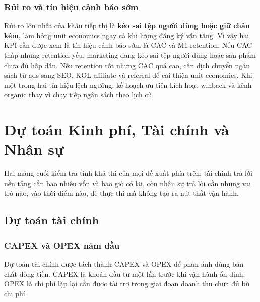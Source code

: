 \subsubsection{Rủi ro và tín hiệu cảnh báo sớm}

Rủi ro lớn nhất của khâu tiếp thị là \textbf{kéo sai tệp người dùng hoặc giữ chân kém}, làm hỏng unit economics ngay cả khi lượng đăng ký vẫn tăng. Vì vậy hai KPI cần được xem là tín hiệu cảnh báo sớm là CAC và M1 retention. Nếu CAC thấp nhưng retention yếu, marketing đang kéo sai tệp người dùng hoặc sản phẩm chưa đủ hấp dẫn. Nếu retention tốt nhưng CAC quá cao, cần dịch chuyển ngân sách từ ads sang SEO, KOL affiliate và referral để cải thiện unit economics. Khi một trong hai tín hiệu lệch ngưỡng, kế hoạch ưu tiên kích hoạt winback và kênh organic thay vì chạy tiếp ngân sách theo lịch cũ.

\section{Dự toán Kinh phí, Tài chính và Nhân sự}

Hai mảng cuối kiểm tra tính khả thi của mọi đề xuất phía trên: tài chính trả lời nền tảng cần bao nhiêu vốn và bao giờ có lãi, còn nhân sự trả lời cần những vai trò nào, vào thời điểm nào, để thực thi mà không tạo ra nút thắt vận hành.

\subsection{Dự toán tài chính}

\subsubsection{CAPEX và OPEX năm đầu}

Dự toán tài chính được tách thành CAPEX và OPEX để phản ánh đúng bản chất dòng tiền. CAPEX là khoản đầu tư một lần trước khi vận hành ổn định; OPEX là chi phí lặp lại cần được tài trợ trong giai đoạn doanh thu chưa đủ bù chi phí.

